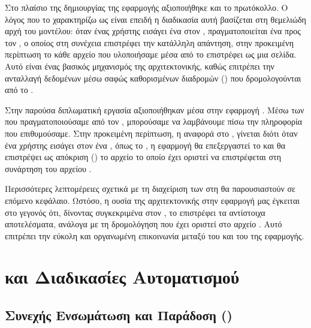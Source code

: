 Στο πλαίσιο της δημιουργίας της εφαρμογής αξιοποιήθηκε και το  πρωτόκολλο. Ο λόγος που το χαρακτηρίζω ως  είναι επειδή η διαδικασία αυτή βασίζεται στη θεμελιώδη αρχή του   μοντέλου: όταν ένας χρήστης εισάγει ένα  στον , πραγματοποιείται ένα  προς τον , ο οποίος στη συνέχεια επιστρέφει την κατάλληλη απάντηση, στην προκειμένη περίπτωση το κάθε αρχείο  που υλοποιήσαμε μέσα από το  επιστρέφει ως   μια  σελίδα. Αυτό είναι ένας βασικός μηχανισμός της  αρχιτεκτονικής, καθώς επιτρέπει την ανταλλαγή δεδομένων μέσω σαφώς καθορισμένων διαδρομών () που δρομολογούνται από το .

Στην παρούσα διπλωματική εργασία αξιοποιήθηκαν  μέσα στην εφαρμογή . Μέσω των   που πραγματοποιούσαμε από τον , μπορούσαμε να λαμβάνουμε πίσω την πληροφορία που επιθυμούσαμε. Στην προκειμένη περίπτωση, η αναφορά στο , γίνεται διότι όταν ένα χρήστης εισάγει στον  ένα , όπως το , η εφαρμογή θα επεξεργαστεί το  και θα επιστρέψει ως απόκριση () το αρχείο  το οποίο έχει οριστεί να επιστρέφεται στη συνάρτηση  του αρχείου .

Περισσότερες λεπτομέρειες σχετικά με τη διαχείριση των  στη  θα παρουσιαστούν σε επόμενο κεφάλαιο. Ωστόσο, η ουσία της αρχιτεκτονικής  στην εφαρμογή μας έγκειται στο γεγονός ότι, δίνοντας συγκεκριμένα  στον , το  επιστρέφει τα αντίστοιχα αποτελέσματα, ανάλογα με τη δρομολόγηση που έχει οριστεί στο αρχείο . Αυτό επιτρέπει την εύκολη και οργανωμένη επικοινωνία μεταξύ του  και του  της εφαρμογής.

\section{ και Διαδικασίες Αυτοματισμού}

\subsection{Συνεχής Ενσωμάτωση και Παράδοση () }

